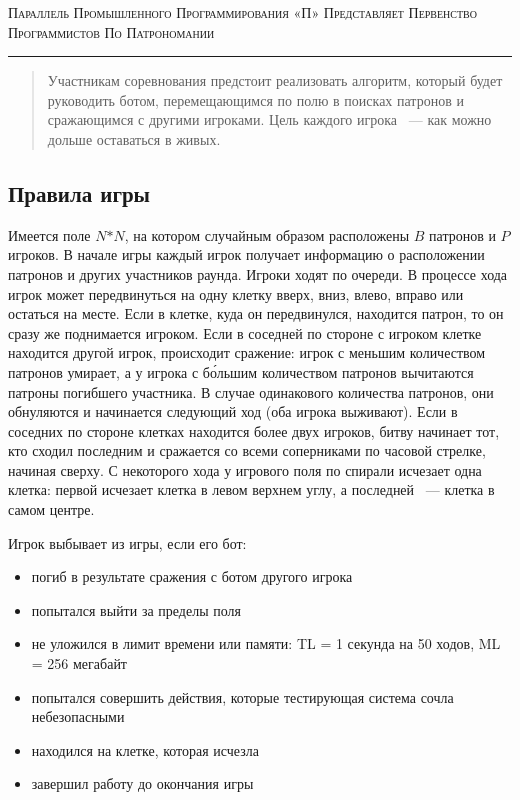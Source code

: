 \documentclass[a4paper,12pt]{article}
\begin{document}
\begin{center}
{\small\textsc{Параллель Промышленного Программирования «П» Представляет Первенство Программистов По Патрономании}}
\vskip 1pt \hrule \vskip 3pt

\end{center}
\begin{abstract}
Участникам соревнования предстоит реализовать алгоритм, который будет руководить ботом, перемещающимся по полю в поисках патронов и сражающимся с другими игроками. Цель каждого игрока ~--- как можно дольше оставаться в живых.
\end{abstract}
\subsection{Правила игры}
Имеется поле $N$$*$$N$, на котором случайным образом расположены $B$ патронов и $P$ игроков. В начале игры каждый игрок получает информацию о расположении патронов и других участников раунда. Игроки ходят по очереди. В процессе хода игрок может передвинуться на одну клетку вверх, вниз, влево, вправо или остаться на месте. Если в клетке, куда он передвинулся, находится патрон, то он сразу же поднимается игроком. Если в соседней по стороне с игроком клетке находится другой игрок, происходит сражение: игрок с меньшим количеством патронов умирает, а у игрока с б\'{о}льшим количеством патронов вычитаются патроны погибшего участника. В случае одинакового количества патронов, они обнуляются и начинается следующий ход (оба игрока выживают). Если в соседних по стороне клетках находится более двух игроков, битву начинает тот, кто сходил последним и сражается со всеми соперниками по часовой стрелке, начиная сверху. С некоторого хода у игрового поля по спирали исчезает одна клетка: первой исчезает клетка в левом верхнем углу, а последней ~--- клетка в самом центре.
\begin{flushleft}
Игрок выбывает из игры, если его бот:
\begin{itemize}
\item погиб в результате сражения с ботом другого игрока
\item попытался выйти за пределы поля
\item не уложился в лимит времени или памяти:
TL = 1 секунда на 50 ходов, ML = 256 мегабайт
\item попытался совершить действия, которые тестирующая система сочла небезопасными
\item находился на клетке, которая исчезла
\item завершил работу до окончания игры
\end{itemize}
\end{flushleft}
\end{document}
